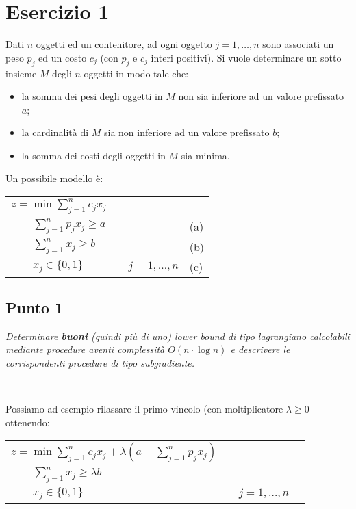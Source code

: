 \documentclass[11pt]{book}
\begin{document}
\chapter*{Esercizio 1}

Dati $n$ oggetti ed un contenitore, ad ogni oggetto $j=1,\dots,n$ sono
associati un peso $p_j$ ed un costo $c_j$ (con $p_j$ e $c_j$ interi
positivi). Si vuole determinare un sotto insieme $M$ degli $n$ oggetti
in modo tale che:

\begin{itemize}
\item la somma dei pesi degli oggetti in $M$ non sia inferiore ad un
  valore prefissato $a$;
\item la cardinalit\`a di $M$ sia non inferiore ad un valore
  prefissato $b$;
\item la somma dei costi degli oggetti in $M$ sia minima.
\end{itemize}

Un possibile modello \`e:

\begin{center}
\begin{tabular}{lp{2cm}ll}
$z = \min \sum\limits_{j=1}^n c_jx_j$ & & & \\
$\qquad \sum\limits_{j = 1}^n p_jx_j \geq a$ & & & (a)\\
$\qquad \sum\limits_{j=1}^n x_j \geq b$ & & & (b)\\
$\qquad x_j \in\{0,1\}$ & & $j = 1,\dots,n$ & (c) \\
\end{tabular}
\end{center}

\section*{Punto 1}

\textit{Determinare \textbf{buoni} (quindi pi\`u di uno) lower bound
  di tipo lagrangiano calcolabili mediante procedure aventi
  complessit\`a $O(n \cdot \log n)$ e descrivere le corrispondenti
  procedure di tipo subgradiente.}

\

Possiamo ad esempio rilassare il primo vincolo (con moltiplicatore
$\lambda \geq 0$ ottenendo:

\begin{center}
\begin{tabular}{lp{2cm}ll}
  $z = \min \sum\limits_{j=1}^n c_jx_j + \lambda (a - \sum\limits_{j = 1}^n
  p_jx_j) $ & & & \\
  $\qquad \sum\limits_{j=1}^n x_j \geq \lambda b$ & & & \\
  $\qquad x_j \in\{0,1\}$ & & $j = 1,\dots,n$ & \\
\end{tabular}
\end{center}
\end{document}
